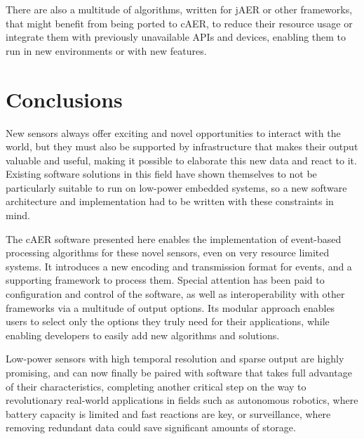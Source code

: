 \documentclass[a4paper,12pt]{report}
\begin{document}
There are also a multitude of algorithms, written for jAER or other frameworks, that might benefit from being ported to cAER, to reduce their resource usage or integrate them with previously unavailable APIs and devices, enabling them to run in new environments or with new features.

\chapter{Conclusions} \label{chap:conclusions}

New sensors always offer exciting and novel opportunities to interact with the world, but they must also be supported by infrastructure that makes their output valuable and useful, making it possible to elaborate this new data and react to it.
Existing software solutions in this field have shown themselves to not be particularly suitable to run on low-power embedded systems, so a new software architecture and implementation had to be written with these constraints in mind.

The cAER software presented here enables the implementation of event-based processing algorithms for these novel sensors, even on very resource limited systems.
It introduces a new encoding and transmission format for events, and a supporting framework to process them.
Special attention has been paid to configuration and control of the software, as well as interoperability with other frameworks via a multitude of output options.
Its modular approach enables users to select only the options they truly need for their applications, while enabling developers to easily add new algorithms and solutions.

Low-power sensors with high temporal resolution and sparse output are highly promising, and can now finally be paired with software that takes full advantage of their characteristics, completing another critical step on the way to revolutionary real-world applications in fields such as autonomous robotics, where battery capacity is limited and fast reactions are key, or surveillance, where removing redundant data could save significant amounts of storage.
\end{document}
